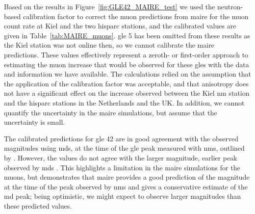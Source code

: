 Based on the results in Figure~\ref{fig:GLE42_MAIRE_test} we used the neutron-based calibration factor to correct the muon predictions from \gls{maire} for the muon count rate at Kiel and the two \gls{hisparc} stations, and the calibrated values are given in Table~\ref{tab:MAIRE_muons}. \gls{gle} 5 has been omitted from these results as the Kiel station was not online then, so we cannot calibrate the \gls{maire} predictions. These values effectively represent a zeroth- or first-order approach to estimating the muon increase that would be observed for these \glspl{gle} with the data and information we have available. The calculations relied on the assumption that the application of the calibration factor was acceptable, and that anisotropy does not have a significant effect on the increase observed between the Kiel \gls{nm} station and the \gls{hisparc} stations in the Netherlands and the UK. In addition, we cannot quantify the uncertainty in the \gls{maire} simulations, but assume that the uncertainty is small.

The calibrated predictions for \gls{gle} 42 are in good agreement with the observed magnitudes using \glspl{md}, at the time of the \gls{gle} peak measured with \glspl{nm}, outlined by \citet{lovell_extended_1998}. However, the values do not agree with the larger magnitude, earlier peak observed by \glspl{md} \citep{lovell_extended_1998}. This highlights a limitation in the \gls{maire} simulations for the muons, but demonstrates that \gls{maire} provides a good prediction of the magnitude at the time of the peak observed by \glspl{nm} and gives a conservative estimate of the \gls{md} peak; being optimistic, we might expect to observe larger magnitudes than these predicted values.   %


